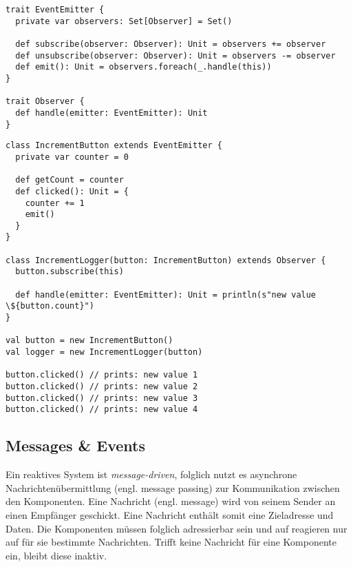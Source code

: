 \begin{lstlisting}[caption={Codebeispiel für das Observer-Pattern.},label={lst:lst5}]
trait EventEmitter {
  private var observers: Set[Observer] = Set()

  def subscribe(observer: Observer): Unit = observers += observer
  def unsubscribe(observer: Observer): Unit = observers -= observer
  def emit(): Unit = observers.foreach(_.handle(this))
}

trait Observer {
  def handle(emitter: EventEmitter): Unit
}
\end{lstlisting}

\pagebreak

\begin{lstlisting}[caption={Codebeispiel für das Observer-Pattern.},label={lst:lst6}]
class IncrementButton extends EventEmitter {
  private var counter = 0

  def getCount = counter
  def clicked(): Unit = {
    counter += 1
    emit()
  }
}

class IncrementLogger(button: IncrementButton) extends Observer {
  button.subscribe(this)

  def handle(emitter: EventEmitter): Unit = println(s"new value \${button.count}")
}

val button = new IncrementButton()
val logger = new IncrementLogger(button)

button.clicked() // prints: new value 1
button.clicked() // prints: new value 2
button.clicked() // prints: new value 3
button.clicked() // prints: new value 4
\end{lstlisting}

\subsection{Messages \& Events}
Ein reaktives System ist \textit{message-driven}, folglich nutzt es asynchrone Nachrichtenübermittlung (engl. message passing) zur Kommunikation zwischen den Komponenten. Eine Nachricht (engl. message) wird von seinem Sender an einen Empfänger geschickt. Eine Nachricht enthält somit eine Zieladresse und Daten. Die Komponenten müssen folglich adressierbar sein und auf reagieren nur auf für sie bestimmte Nachrichten. Trifft keine Nachricht für eine Komponente ein, bleibt diese inaktiv.



